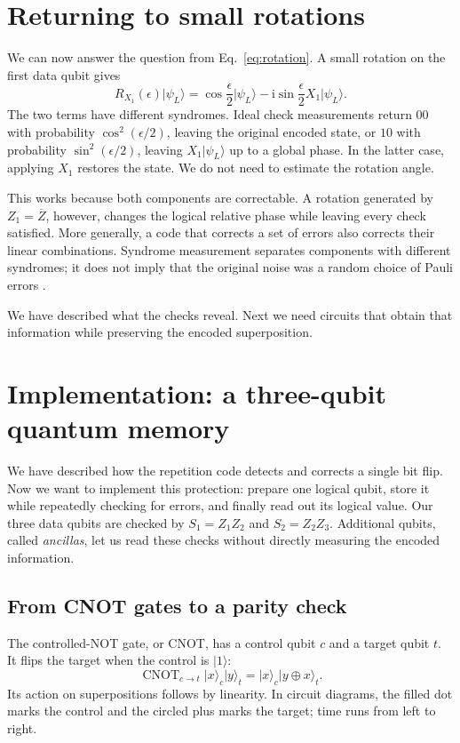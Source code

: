 \documentclass[11pt,a4paper]{article}
\newcommand{\ket}[1]{\lvert #1\rangle}
\newcommand{\ii}{\mathrm{i}}
\newcommand{\cnot}{\operatorname{CNOT}}
\begin{document}
\section{Returning to small rotations}
We can now answer the question from Eq.~\eqref{eq:rotation}. A small rotation on the first data qubit gives
\begin{equation}
R_{X_1}(\epsilon)\ket{\psi_L}
=\cos\frac{\epsilon}{2}\ket{\psi_L}
-\ii\sin\frac{\epsilon}{2}X_1\ket{\psi_L}.
\end{equation}
The two terms have different syndromes. Ideal check measurements return \(00\) with probability \(\cos^2(\epsilon/2)\), leaving the original encoded state, or \(10\) with probability \(\sin^2(\epsilon/2)\), leaving \(X_1\ket{\psi_L}\) up to a global phase. In the latter case, applying \(X_1\) restores the state. We do not need to estimate the rotation angle.

This works because both components are correctable. A rotation generated by \(Z_1=\overline Z\), however, changes the logical relative phase while leaving every check satisfied. More generally, a code that corrects a set of errors also corrects their linear combinations. Syndrome measurement separates components with different syndromes; it does not imply that the original noise was a random choice of Pauli errors \cite{ibm-errors}.

We have described what the checks reveal. Next we need circuits that obtain that information while preserving the encoded superposition.

\newpage
\section{Implementation: a three-qubit quantum memory}\label{sec:implementation}

We have described how the repetition code detects and corrects a
single bit flip. Now we want to implement this protection: prepare one
logical qubit, store it while repeatedly checking for errors, and
finally read out its logical value. Our three data qubits are checked
by \(S_1=Z_1Z_2\) and \(S_2=Z_2Z_3\). Additional qubits, called
\emph{ancillas}, let us read these checks without directly measuring
the encoded information.

\subsection{From CNOT gates to a parity check}

The controlled-NOT gate, or CNOT, has a control qubit \(c\) and a
target qubit \(t\). It flips the target when the control is
\(\ket1\):
\begin{equation}
\cnot_{c\to t}\ket{x}_c\ket{y}_t
=\ket{x}_c\ket{y\oplus x}_t.
\end{equation}
Its action on superpositions follows by linearity. In circuit
diagrams, the filled dot marks the control and the circled plus marks
the target; time runs from left to right.
\end{document}
